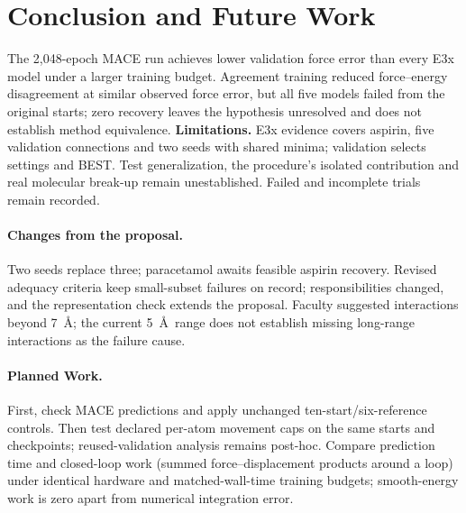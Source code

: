 \documentclass{article}
\begin{document}
\section{Conclusion and Future Work}
The 2,048-epoch MACE run achieves lower validation force error than every E3x model under a larger training budget. Agreement training reduced force--energy disagreement at similar observed force error, but all five models failed from the original starts; zero recovery leaves the hypothesis unresolved and does not establish method equivalence. \textbf{Limitations.} E3x evidence covers aspirin, five validation connections and two seeds with shared minima; validation selects settings and BEST. Test generalization, the procedure's isolated contribution and real molecular break-up remain unestablished. Failed and incomplete trials remain recorded.

\paragraph{Changes from the proposal.}
Two seeds replace three; paracetamol awaits feasible aspirin recovery. Revised adequacy criteria keep small-subset failures on record; responsibilities changed, and the representation check extends the proposal. Faculty suggested interactions beyond 7~\AA; the current 5~\AA\ range does not establish missing long-range interactions as the failure cause.
\paragraph{Planned Work.} First, check MACE predictions and apply unchanged ten-start/six-reference controls. Then test declared per-atom movement caps on the same starts and checkpoints; reused-validation analysis remains post-hoc. Compare prediction time and closed-loop work (summed force--displacement products around a loop) under identical hardware and matched-wall-time training budgets; smooth-energy work is zero apart from numerical integration error.
\end{document}

